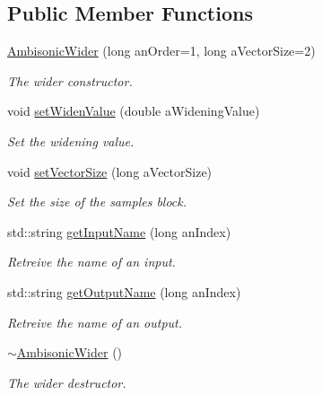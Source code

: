 \subsection*{Public Member Functions}
\begin{DoxyCompactItemize}
\item 
\hyperlink{class_ambisonic_wider_a8e46f8e6bc4eda1c6c17f632d2e1a12f}{Ambisonic\-Wider} (long an\-Order=1, long a\-Vector\-Size=2)
\begin{DoxyCompactList}\small\item\em The wider constructor. \end{DoxyCompactList}\item 
void \hyperlink{class_ambisonic_wider_a26597b62bcb8d892591ad5362702edca}{set\-Widen\-Value} (double a\-Widening\-Value)
\begin{DoxyCompactList}\small\item\em Set the widening value. \end{DoxyCompactList}\item 
void \hyperlink{class_ambisonic_wider_af970c4c71f96afa96649d9c1a1387043}{set\-Vector\-Size} (long a\-Vector\-Size)
\begin{DoxyCompactList}\small\item\em Set the size of the samples block. \end{DoxyCompactList}\item 
std\-::string \hyperlink{class_ambisonic_wider_a405f99a0427aa56d945acbe7f1a09582}{get\-Input\-Name} (long an\-Index)
\begin{DoxyCompactList}\small\item\em Retreive the name of an input. \end{DoxyCompactList}\item 
std\-::string \hyperlink{class_ambisonic_wider_a5c5c88a09477812991122b290117faf9}{get\-Output\-Name} (long an\-Index)
\begin{DoxyCompactList}\small\item\em Retreive the name of an output. \end{DoxyCompactList}\item 
\hypertarget{class_ambisonic_wider_a98b370684ad2cc2d1bdf75add135f1c7}{\hyperlink{class_ambisonic_wider_a98b370684ad2cc2d1bdf75add135f1c7}{$\sim$\-Ambisonic\-Wider} ()}\label{class_ambisonic_wider_a98b370684ad2cc2d1bdf75add135f1c7}

\begin{DoxyCompactList}\small\item\em The wider destructor. \end{DoxyCompactList}\end{DoxyCompactItemize}
